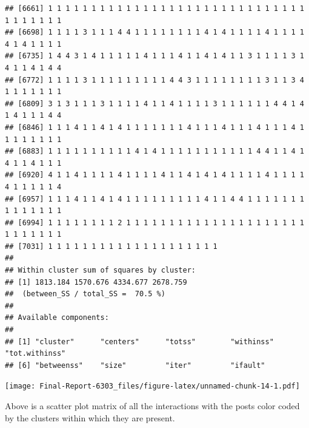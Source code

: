 \documentclass[
]{article}
\newenvironment{Shaded}{\begin{snugshade}}{\end{snugshade}}
\newcommand{\AttributeTok}[1]{\textcolor[rgb]{0.13,0.29,0.53}{#1}}
\newcommand{\CommentTok}[1]{\textcolor[rgb]{0.56,0.35,0.01}{\textit{#1}}}
\newcommand{\ConstantTok}[1]{\textcolor[rgb]{0.56,0.35,0.01}{#1}}
\newcommand{\DecValTok}[1]{\textcolor[rgb]{0.00,0.00,0.81}{#1}}
\newcommand{\FunctionTok}[1]{\textcolor[rgb]{0.13,0.29,0.53}{\textbf{#1}}}
\newcommand{\NormalTok}[1]{#1}
\newcommand{\OtherTok}[1]{\textcolor[rgb]{0.56,0.35,0.01}{#1}}
\newcommand{\SpecialCharTok}[1]{\textcolor[rgb]{0.81,0.36,0.00}{\textbf{#1}}}
\newcommand{\StringTok}[1]{\textcolor[rgb]{0.31,0.60,0.02}{#1}}
\begin{document}
\begin{verbatim}
## [6661] 1 1 1 1 1 1 1 1 1 1 1 1 1 1 1 1 1 1 1 1 1 1 1 1 1 1 1 1 1 1 1 1 1 1 1 1 1
## [6698] 1 1 1 1 3 1 1 1 4 4 1 1 1 1 1 1 1 1 4 1 4 1 1 1 1 4 1 1 1 1 4 1 4 1 1 1 1
## [6735] 1 4 4 3 1 4 1 1 1 1 1 4 1 1 1 4 1 1 4 1 4 1 1 3 1 1 1 1 3 1 4 1 1 4 1 4 4
## [6772] 1 1 1 1 3 1 1 1 1 1 1 1 1 1 4 4 3 1 1 1 1 1 1 1 1 3 1 1 3 4 1 1 1 1 1 1 1
## [6809] 3 1 3 1 1 1 3 1 1 1 1 4 1 1 4 1 1 1 1 3 1 1 1 1 1 1 4 4 1 4 1 4 1 1 1 4 4
## [6846] 1 1 1 4 1 1 4 1 4 1 1 1 1 1 1 1 4 1 1 1 4 1 1 1 4 1 1 1 4 1 1 1 1 1 1 1 1
## [6883] 1 1 1 1 1 1 1 1 1 1 4 1 4 1 1 1 1 1 1 1 1 1 1 1 4 4 1 1 4 1 4 1 1 4 1 1 1
## [6920] 4 1 1 4 1 1 1 1 4 1 1 1 1 4 1 1 4 1 4 1 4 1 1 1 1 4 1 1 1 1 4 1 1 1 1 1 4
## [6957] 1 1 1 4 1 1 4 1 4 1 1 1 1 1 1 1 1 1 4 1 1 4 4 1 1 1 1 1 1 1 1 1 1 1 1 1 1
## [6994] 1 1 1 1 1 1 1 1 2 1 1 1 1 1 1 1 1 1 1 1 1 1 1 1 1 1 1 1 1 1 1 1 1 1 1 1 1
## [7031] 1 1 1 1 1 1 1 1 1 1 1 1 1 1 1 1 1 1 1 1
## 
## Within cluster sum of squares by cluster:
## [1] 1813.184 1570.676 4334.677 2678.759
##  (between_SS / total_SS =  70.5 %)
## 
## Available components:
## 
## [1] "cluster"      "centers"      "totss"        "withinss"     "tot.withinss"
## [6] "betweenss"    "size"         "iter"         "ifault"
\end{verbatim}

\begin{Shaded}
\end{Shaded}

\texttt{[image: Final-Report-6303\_files/figure-latex/unnamed-chunk-14-1.pdf]}

Above is a scatter plot matrix of all the interactions with the posts
color coded by the clusters within which they are present.

\begin{Shaded}
\end{Shaded}
\end{document}
